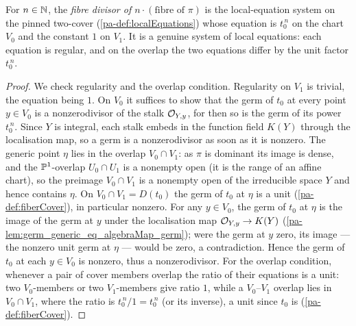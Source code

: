 \begin{definition}
  \label{pa-def:fiberDivisor}
  \leanok

  For \(n \in \mathbb{N}\), the \emph{fibre divisor of \(n\cdot(\text{fibre of }\pi)\)} is the
  local-equation system on the pinned two-cover (\ref{pa-def:localEquations}) whose equation is
  \(t_0^{\,n}\) on the chart \(V_0\) and the constant \(1\) on \(V_1\). It is a genuine system of
  local equations: each equation is regular, and on the overlap the two equations differ by the unit
  factor \(t_0^{\,n}\).
\end{definition}
\begin{proof}
  \leanok
  We check regularity and the overlap condition. Regularity on \(V_1\) is trivial, the equation
  being \(1\). On \(V_0\) it suffices to show that the germ of \(t_0\) at every point \(y \in V_0\)
  is a nonzerodivisor of the stalk \(\mathcal{O}_{Y,y}\), for then so is the germ of its power
  \(t_0^{\,n}\). Since \(Y\) is integral, each stalk embeds in the function field \(K(Y)\) through
  the localisation map, so a germ is a nonzerodivisor as soon as it is nonzero. The generic point
  \(\eta\) lies in the overlap \(V_0 \cap V_1\): as \(\pi\) is dominant its image is dense, and the
  \(\mathbb{P}^1\)-overlap \(U_0 \cap U_1\) is a nonempty open (it is the range of an affine chart), so the
  preimage \(V_0 \cap V_1\) is a nonempty open of the irreducible space \(Y\) and hence contains
  \(\eta\). On \(V_0 \cap V_1 = D(t_0)\) the germ of \(t_0\) at \(\eta\) is a unit
  (\ref{pa-def:fiberCover}), in particular nonzero. For any \(y \in V_0\), the germ of \(t_0\) at
  \(\eta\) is the image of the germ at \(y\) under the localisation map \(\mathcal{O}_{Y,y} \to K(Y)\)
  (\ref{pa-lem:germ_generic_eq_algebraMap_germ}); were the germ at \(y\) zero, its image --- the
  nonzero unit germ at \(\eta\) --- would be zero, a contradiction. Hence the germ of \(t_0\) at each
  \(y \in V_0\) is nonzero, thus a nonzerodivisor. For the overlap condition, whenever a pair of
  cover members overlap the ratio of their equations is a unit: two \(V_0\)-members or two
  \(V_1\)-members give ratio \(1\), while a \(V_0\)--\(V_1\) overlap lies in \(V_0 \cap V_1\), where
  the ratio is \(t_0^{\,n}/1 = t_0^{\,n}\) (or its inverse), a unit since \(t_0\) is
  (\ref{pa-def:fiberCover}).
\end{proof}

